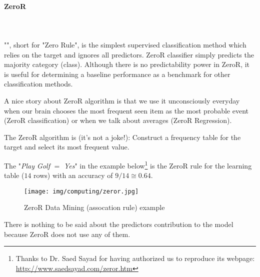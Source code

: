 	\paragraph{ZeroR}\mbox{}\\\\
	"", short for "Zero Rule", is the simplest supervised classification method which relies on the target and ignores all predictors. ZeroR classifier simply predicts the majority category (class). Although there is no predictability power in ZeroR, it is useful for determining a baseline performance as a benchmark for other classification methods.
	
	A nice story about ZeroR algorithm is that we use it unconsciously everyday when our brain chooses the most frequent seen item as the most probable event (ZeroR classification) or when we talk about averages (ZeroR Regression).
	
	The ZeroR algorithm is (it's not a joke!): Construct a frequency table for the target and select its most frequent value.
	
	The "\textit{Play Golf} $=$ \textit{Yes}" in the example below\footnote{Thanks to Dr. Saed Sayad for having authorized us to reproduce its webpage: \url{http://www.saedsayad.com/zeror.htm}} is the ZeroR rule for the learning table ($14$ rows) with an accuracy of $9/14\cong 0.64$.
	\begin{figure}[H]
		\centering
		\texttt{[image: img/computing/zeror.jpg]}
		\caption{ZeroR Data Mining (assocation rule) example}
	\end{figure}
	There is nothing to be said about the predictors contribution to the model because ZeroR does not use any of them.
	
